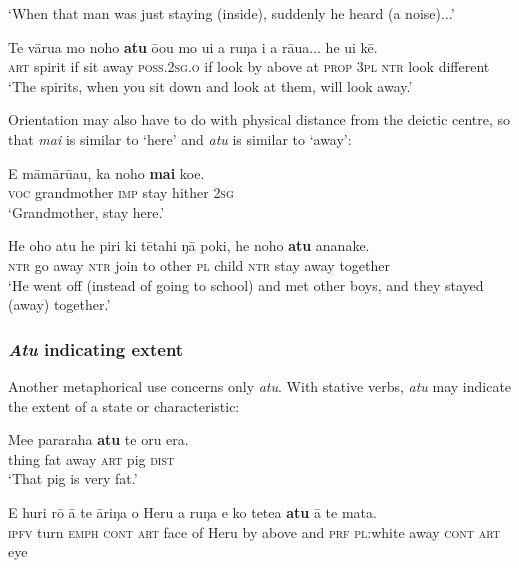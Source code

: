 \glt 
‘When that man was just staying (inside), suddenly he heard (a noise)...’ \textstyleExampleref{[R372.103]} 
\z

\ea\label{ex:7.146}
\gll Te vārua mo noho \textbf{atu} ō{\ꞌ}ou mo u{\ꞌ}i a ruŋa i a rāua... he u{\ꞌ}i kē.\\
\textsc{art} spirit if sit away \textsc{poss.2sg.o} if look by above at \textsc{prop} \textsc{3pl} \textsc{ntr} look different\\

\glt
‘The spirits, when you sit down and look at them, will look away.’ \textstyleExampleref{[R310.082]} 
\z

Orientation may also have to do with physical distance from the deictic centre, so that \textit{mai} is similar to ‘here’ and \textit{atu} is similar to ‘away’:

\ea\label{ex:7.147}
\gll E māmārū{\ꞌ}au, ka noho \textbf{mai} koe.\\
\textsc{voc} grandmother \textsc{imp} stay hither \textsc{2sg}\\

\glt 
‘Grandmother, stay here.’ \textstyleExampleref{[R313.177]} 
\z

\ea\label{ex:7.148}
\gll He oho atu he piri ki tētahi ŋā poki, he noho \textbf{atu} ananake.\\
\textsc{ntr} go away \textsc{ntr} join to other \textsc{pl} child \textsc{ntr} stay away together\\

\glt 
‘He went off (instead of going to school) and met other boys, and they stayed (away) together.’ \textstyleExampleref{[R250.034]} 
\z

\subsubsection{\textit{Atu} indicating extent}\label{sec:7.5.1.5}

Another metaphorical use concerns only \textit{atu}. With stative verbs, \textit{atu} may indicate the extent of a state or characteristic:

\ea\label{ex:7.149}
\gll Me{\ꞌ}e pararaha \textbf{atu} te oru era. \\
thing fat away \textsc{art} pig \textsc{dist} \\

\glt 
‘That pig is very fat.’ \textstyleExampleref{[Notes]}
\z

\ea\label{ex:7.150}
\gll E huri rō {\ꞌ}ā te {\ꞌ}āriŋa o Heru a ruŋa {\ꞌ}e ko tetea \textbf{atu} {\ꞌ}ā  te mata.\\
\textsc{ipfv} turn \textsc{emph} \textsc{cont} \textsc{art} face of Heru by above and \textsc{prf} \textsc{pl}:white away \textsc{cont}  \textsc{art} eye\\


